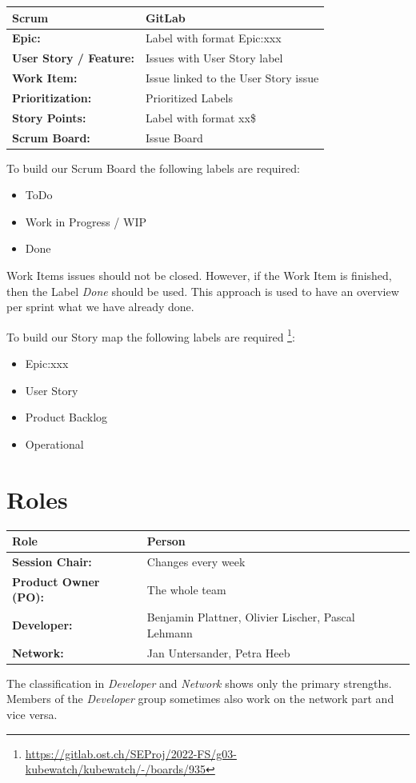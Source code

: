 \begin{tabular}{l|l}
  \centering
  \textbf{Scrum} & \textbf{GitLab} \\
  \hline
  \textbf{Epic:} & Label with format Epic:xxx \\
  \textbf{User Story / Feature:} & Issues with User Story label \\
  \textbf{Work Item:} & Issue linked to the User Story issue \\
  \textbf{Prioritization:} & Prioritized Labels \\
  \textbf{Story Points:} & Label with format xx\$ \\
  \textbf{Scrum Board:} & Issue Board \\
\end{tabular} \newline

\noindent To build our Scrum Board the following labels are required:

\begin{itemize}
\item ToDo
\item Work in Progress / WIP
\item Done
\end{itemize}

\noindent Work Items issues should not be closed.
However, if the Work Item is finished, then the Label \textsl{Done} should be used.
This approach is used to have an overview per sprint what we have already done.

\noindent To build our Story map the following labels are required \footnote{\url{https://gitlab.ost.ch/SEProj/2022-FS/g03-kubewatch/kubewatch/-/boards/935}}:

\begin{itemize}
\item Epic:xxx
\item User Story
\item Product Backlog
\item Operational
\end{itemize}

\section{Roles}
\label{roles}

\begin{tabular}{l|l}
    \textbf{Role} & \textbf{Person}\\
    \hline
    \textbf{Session Chair:} & Changes every week \\
    \textbf{Product Owner (PO):} & The whole team \\
    \textbf{Developer:} & Benjamin Plattner, Olivier Lischer, Pascal Lehmann\\
    \textbf{Network:} & Jan Untersander, Petra Heeb \\
\end{tabular}
\newline
\noindent The classification in \textsl{Developer} and \textsl{Network} shows only the primary strengths.
Members of the \textsl{Developer} group sometimes also work on the network part and vice versa.


